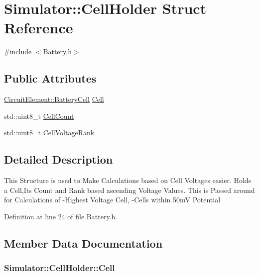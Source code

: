 \hypertarget{struct_simulator_1_1_cell_holder}{}\section{Simulator\+:\+:Cell\+Holder Struct Reference}
\label{struct_simulator_1_1_cell_holder}


{\ttfamily \#include $<$Battery.\+h$>$}

\subsection*{Public Attributes}
\begin{DoxyCompactItemize}
\item 
\hyperlink{namespace_simulator_1_1_circuit_element_a2f25ffbed70e35fab058b16f65277c9e}{Circuit\+Element\+::\+Battery\+Cell} \hyperlink{struct_simulator_1_1_cell_holder_a9b125364667286c3e396f59099b97aee}{Cell}
\item 
std\+::uint8\+\_\+t \hyperlink{struct_simulator_1_1_cell_holder_a4fbefa2b4bd016d751d61955c41d3e85}{Cell\+Count}
\item 
std\+::uint8\+\_\+t \hyperlink{struct_simulator_1_1_cell_holder_a439559f5de39a0ebce5372f2d207702f}{Cell\+Voltage\+Rank}
\end{DoxyCompactItemize}


\subsection{Detailed Description}
This Structure is used to Make Calculations based on Cell Voltages easier. Holds a Cell,Its Count and Rank based ascending Voltage Values. This is Passed around for Calculations of -\/\+Highest Voltage Cell, -\/\+Cells within 50m\+V Potential 

Definition at line 24 of file Battery.\+h.



\subsection{Member Data Documentation}
\hypertarget{struct_simulator_1_1_cell_holder_a9b125364667286c3e396f59099b97aee}{}
\subsubsection[{Cell}]{ Simulator\+::\+Cell\+Holder\+::\+Cell}\label{struct_simulator_1_1_cell_holder_a9b125364667286c3e396f59099b97aee}


